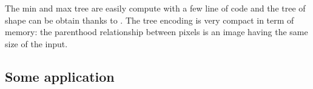 The min and max tree are easily compute with a few line of code \cite{berger.07.icip} and the tree of shape can be obtain thanks to \cite{geraud.13.ismm}. The tree encoding is very compact in term of memory: the parenthood relationship between pixels is an image having the same size of the input. 

\subsection{Some application}